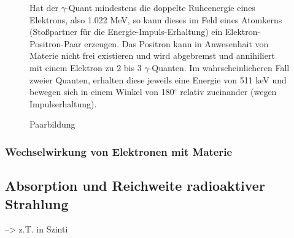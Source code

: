 \begin{figure}[H]
	\begin{minipage}{0.5\textwidth}
	\centering %
	\caption{Paarbildung}
	\end{minipage}
	\begin{minipage}{0.5\textwidth}
	Hat der $\gamma$-Quant mindestens die doppelte Ruheenergie eines Elektrons, also 1.022 MeV, so kann dieses im Feld eines Atomkerns (Stoßpartner für die Energie-Impuls-Erhaltung) ein Elektron-Positron-Paar erzeugen. Das Positron kann in Anwesenhait von Materie nicht frei existieren und wird abgebremst und annihiliert mit einem Elektron zu 2 bis 3 $\gamma$-Quanten. Im wahrscheinlicheren Fall zweier Quanten, erhalten diese jeweils eine Energie von 511 keV und bewegen sich in einem Winkel von 180$^\circ$ relativ zueinander (wegen Impulserhaltung).
	\end{minipage}
\end{figure}

\subsubsection{Wechselwirkung von Elektronen mit Materie}

\subsection{Absorption und Reichweite radioaktiver Strahlung}
 --> z.T. in Szinti

